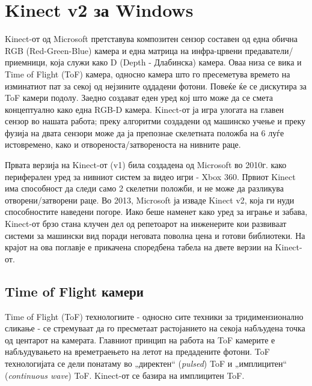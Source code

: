 \documentclass[12pt]{article}
\begin{document}
\newpage

\section{Kinect v2 за Windows}
	Kinect-от од Microsoft претставува композитен сензор составен од една обична RGB (Red-Green-Blue) камера и една матрица на инфра-црвени предаватели/приемници, која служи како D (Depth - Длабинска) камера. Оваа низа се вика и Time of Flight (ToF) камера, односно камера што го пресеметува времето на изминатиот пат за секој од нејзините оддадени фотони. Повеќе ќе се дискутира за ToF камери подолу. Заедно создават еден уред кој што може да се смета концептуално како една RGB-D камера. Kinect-от ја игра улогата на главен сензор во нашата работа; преку алгоритми создадени од машинско учење и преку фузија на двата сензори може да ја препознае скелетната положба на 6 луѓе истовремено, како и отвореноста/затвореноста на нивните раце.

	Првата верзија на Kinect-от (v1) била создадена од Microsoft во 2010г. како периферален уред за нивниот систем за видео игри - Xbox 360. Првиот Kinect има способност да следи само 2 скелетни положби, и не може да разликува отворени/затворени раце. Во 2013, Microsoft ја изваде Kinect v2, која ги нуди способностите наведени погоре. Иако беше наменет како уред за играње и забава, Kinect-от брзо стана клучен дел од репетоарот на инженерите кои развиваат системи за машински вид поради неговата поволна цена и готови библиотеки. На крајот на ова поглавје е прикачена споредбена табела на двете верзии на Kinect-от.

  \subsection{Time of Flight камери}
		Time of Flight (ToF) технологиите - односно сите техники за тридимензионално сликање - се стремуваат да го пресметаат растојанието на секоја набљудена точка од центарот на камерата. Главниот принцип на работа на ToF камерите е набљудувањето на времетраењето на летот на предадените фотони. ToF технологијата се дели понатаму во „директен“ (\textit{pulsed}) ToF и „имплицитен“ (\textit{continuous wave}) ToF. Kinect-от се базира на имплицитен ToF.
\end{document}
